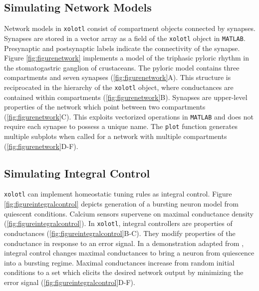 \documentclass{frontiersSCNS} %
\begin{document}
%
%
%
%
%
%

\subsection{Simulating Network Models}

Network models in \texttt{xolotl} consist of compartment objects connected by synapses. Synapses are stored in a vector array as a field of the \texttt{xolotl} object in \texttt{MATLAB}. Presynaptic and postsynaptic labels indicate the connectivity of the synapse. Figure \ref{fig:figurenetwork} implements a model of the triphasic pyloric rhythm in the stomatogastric ganglion of crustaceans. The pyloric model contains three compartments and seven synapses (\ref{fig:figurenetwork}A). This structure is reciprocated in the hierarchy of the \texttt{xolotl} object, where conductances are contained within compartments (\ref{fig:figurenetwork}B). Synapses are upper-level properties of the network which point between two compartments (\ref{fig:figurenetwork}C). This exploits vectorized operations in \texttt{MATLAB} and does not require each synapse to possess a unique name. The \texttt{plot} function generates multiple subplots when called for a network with multiple compartments (\ref{fig:figurenetwork}D-F).

%
%
%
%
%
%

\subsection{Simulating Integral Control}

\texttt{xolotl} can implement homeostatic tuning rules as integral control. Figure \ref{fig:figureintegralcontrol} depicts generation of a bursting neuron model from quiescent conditions. Calcium sensors supervene on maximal conductance density (\ref{fig:figureintegralcontrol}). In \texttt{xolotl}, integral controllers are properties of conductances (\ref{fig:figureintegralcontrol}B-C). They modify properties of the conductance in response to an error signal. In a demonstration adapted from \cite{olearyCorrelationsIonChannel2013}, integral control changes maximal conductances to bring a neuron from quiescence into a bursting regime. Maximal conductances increase from random initial conditions to a set which elicits the desired network output by minimizing the error signal (\ref{fig:figureintegralcontrol}D-F).
\end{document}
